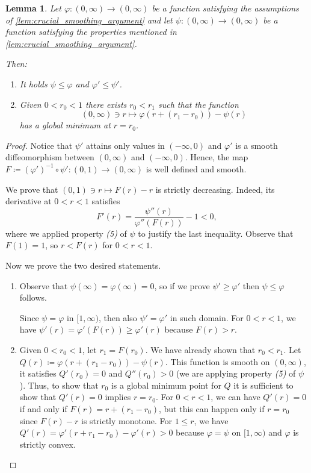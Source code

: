 \documentclass[10pt, reqno]{amsart}
\newcounter{results}[section] %
\theoremstyle{plain}
\newtheorem{lemma}[results]{Lemma}
\theoremstyle{remark}
\theoremstyle{definition}
\numberwithin{equation}{section}
\theoremstyle{plain}
\newcommand{\defeq}{\ensuremath{\coloneqq}}%
\begin{document}
\begin{lemma}\label{lem:smoothing_argument_consequence}
    Let $\varphi:(0,\infty)\to(0,\infty)$ be a function satisfying the assumptions of \cref{lem:crucial_smoothing_argument} and let $\psi:(0,\infty)\to(0,\infty)$ be a function satisfying the properties mentioned in \cref{lem:crucial_smoothing_argument}.

    Then:
    \begin{enumerate}
        \item It holds $\psi\le \varphi$ and $\varphi'\le \psi'$.
        \item Given $0<r_0<1$ there exists $r_0 < r_1$ such that the function 
        \begin{equation*}
            (0,\infty)\ni r\mapsto \varphi(r+(r_1-r_0))-\psi(r)
        \end{equation*}
        has a global minimum at $r=r_0$.
    \end{enumerate}
\end{lemma}
\begin{proof}
    Notice that $\psi'$ attains only values in $(-\infty,0)$ and $\varphi'$ is a smooth diffeomorphism between $(0,\infty)$ and $(-\infty, 0)$. Hence, the map $F\defeq (\varphi')^{-1}\circ \psi':(0,1)\to(0,\infty)$ is well defined and smooth.

    We prove that $(0,1)\ni r\mapsto F(r)-r$ is strictly decreasing. Indeed, its derivative at $0<r<1$ satisfies
    \begin{equation*}
        F'(r) = \frac{\psi''(r)}{\varphi''(F(r))}-1 < 0,
    \end{equation*}
    where we applied property \textit{(5)} of $\psi$ to justify the last inequality.
    Observe that $F(1)=1$, so $r<F(r)$ for $0<r<1$.

    Now we prove the two desired statements.
    \begin{enumerate}
        \item Observe that $\psi(\infty)=\varphi(\infty)=0$, so if we prove $\psi'\ge \varphi'$ then $\psi\le \varphi$ follows.

        Since $\psi=\varphi$ in $[1,\infty)$, then also $\psi'=\varphi'$ in such domain.
        For $0<r<1$, we have $\psi'(r) = \varphi'(F(r)) \ge \varphi'(r)$ because $F(r)>r$.
        \item Given $0<r_0<1$, let $r_1=F(r_0)$. We have already shown that $r_0<r_1$. Let $Q(r)\defeq  \varphi(r+(r_1-r_0))-\psi(r)$. This function is smooth on $(0, \infty)$, it satisfies $Q'(r_0)=0$ and $Q''(r_0) > 0$ (we are applying property \textit{(5)} of $\psi$). 
        Thus, to show that $r_0$ is a global minimum point for $Q$ it is sufficient to show that $Q'(r)=0$ implies $r=r_0$.
        For $0<r<1$, we can have $Q'(r)=0$ if and only if $F(r)=r+(r_1-r_0)$, but this can happen only if $r=r_0$ since $F(r)-r$ is strictly monotone.
        For $1\le r$, we have $Q'(r) = \varphi'(r+r_1-r_0)-\varphi'(r) > 0$ because $\varphi=\psi$ on $[1,\infty)$ and $\varphi$ is strictly convex.
    \end{enumerate}
\end{proof}
\end{document}
